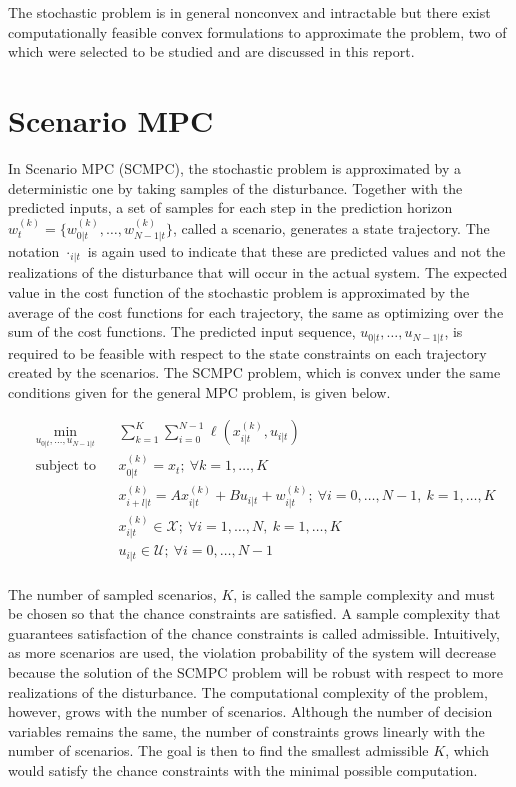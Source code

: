 \documentclass[12 pt]{report}
\begin{document}
The stochastic problem is in general nonconvex and intractable but there exist computationally feasible convex formulations to approximate the problem, two of which were selected to be studied and are discussed in this report.

\section{Scenario MPC}

In Scenario MPC (SCMPC), the stochastic problem is approximated by a deterministic one by taking samples of the disturbance. Together with the predicted inputs, a set of samples for each step in the prediction horizon $w_t^{(k)} = \{w_{0|t}^{(k)}, \dots, w_{N-1|t}^{(k)} \} $, called a scenario, generates a state trajectory. The notation $\cdot_{i|t}$ is again used to indicate that these are predicted values and not the realizations of the disturbance that will occur in the actual system. The expected value in the cost function of the stochastic problem is approximated by the average of the cost functions for each trajectory, the same as optimizing over the sum of the cost functions. The predicted input sequence, $u_{0|t}, \dots, u_{N-1|t}$, is required to be feasible with respect to the state constraints on each trajectory created by the scenarios. The SCMPC problem, which is convex under the same conditions given for the general MPC problem, is given below.

\begin{equation*}
\begin{aligned}
& \min_{u_{0|t}, \dots, u_{N-1|t}} & & \sum_{k = 1}^{K} \sum_{i = 0}^{N-1} \ell (x_{i|t}^{(k)}, u_{i|t}) \\
& \text{subject to} & & x_{0|t}^{(k)} = x_t; ~ \forall k = 1,\dots,K \\
& & & x_{i+l|t}^{(k)} = Ax_{i|t}^{(k)} + Bu_{i|t} + w_{i|t}^{(k)}; ~ \forall i = 0, \dots, N-1, ~k = 1,\dots,K \\
& & & x_{i|t}^{(k)} \in \mathcal{X}; ~ \forall i = 1, \dots, N, ~k = 1,\dots,K \\
& & & u_{i|t} \in \mathcal{U}; ~ \forall i = 0, \dots, N-1 \\
\end{aligned}
\end{equation*}

The number of sampled scenarios, $K$, is called the sample complexity and must be chosen so that the chance constraints are satisfied. A sample complexity that guarantees satisfaction of the chance constraints is called admissible. Intuitively, as more scenarios are used, the violation probability of the system will decrease because the solution of the SCMPC problem will be robust with respect to more realizations of the disturbance. The computational complexity of the problem, however, grows with the number of scenarios. Although the number of decision variables remains the same, the number of constraints grows linearly with the number of scenarios. The goal is then to find the smallest admissible $K$, which would satisfy the chance constraints with the minimal possible computation.
\end{document}
